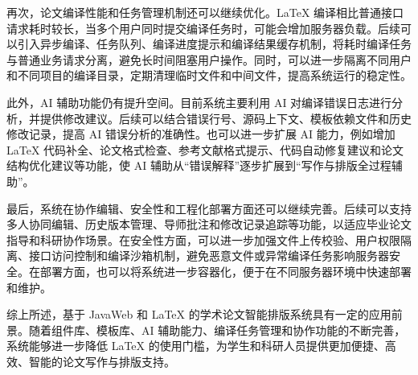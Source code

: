 \documentclass{xduugthesis}
\begin{document}
再次，论文编译性能和任务管理机制还可以继续优化。LaTeX 编译相比普通接口请求耗时较长，当多个用户同时提交编译任务时，可能会增加服务器负载。后续可以引入异步编译、任务队列、编译进度提示和编译结果缓存机制，将耗时编译任务与普通业务请求分离，避免长时间阻塞用户操作。同时，可以进一步隔离不同用户和不同项目的编译目录，定期清理临时文件和中间文件，提高系统运行的稳定性。

此外，AI 辅助功能仍有提升空间。目前系统主要利用 AI 对编译错误日志进行分析，并提供修改建议。后续可以结合错误行号、源码上下文、模板依赖文件和历史修改记录，提高 AI 错误分析的准确性。也可以进一步扩展 AI 能力，例如增加 LaTeX 代码补全、论文格式检查、参考文献格式提示、代码自动修复建议和论文结构优化建议等功能，使 AI 辅助从“错误解释”逐步扩展到“写作与排版全过程辅助”。

最后，系统在协作编辑、安全性和工程化部署方面还可以继续完善。后续可以支持多人协同编辑、历史版本管理、导师批注和修改记录追踪等功能，以适应毕业论文指导和科研协作场景。在安全性方面，可以进一步加强文件上传校验、用户权限隔离、接口访问控制和编译沙箱机制，避免恶意文件或异常编译任务影响服务器安全。在部署方面，也可以将系统进一步容器化，便于在不同服务器环境中快速部署和维护。

综上所述，基于 JavaWeb 和 LaTeX 的学术论文智能排版系统具有一定的应用前景。随着组件库、模板库、AI 辅助能力、编译任务管理和协作功能的不断完善，系统能够进一步降低 LaTeX 的使用门槛，为学生和科研人员提供更加便捷、高效、智能的论文写作与排版支持。
\end{document}
